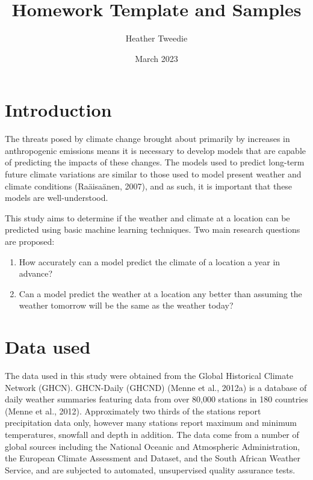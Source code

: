 \documentclass[12pt]{article}
\title{Homework Template and Samples}
\author{Heather Tweedie}
\date{March 2023}
\begin{document}
\markboth{\theauthor}{\thetitle}

\maketitle


\begin{abstract}

\end{abstract}

\section{Introduction}

The threats posed by climate change brought about primarily by increases in anthropogenic emissions means it is necessary to develop
models that are capable of predicting the impacts of these changes. The models used to predict long-term future climate variations
are similar to those used to model present weather and climate conditions (Raäisaänen, 2007), and as such, it is important that these
models are well-understood.

This study aims to determine if the weather and climate at a location can be predicted using basic machine learning techniques. Two
main research questions are proposed:

\begin{enumerate}
  \item How accurately can a model predict the climate of a location a year in advance?
  \item Can a model predict the weather at a location any better than assuming the weather tomorrow will be the same as the weather today?
\end{enumerate}

\section{Data used}

The data used in this study were obtained from the Global Historical Climate Network (GHCN). GHCN-Daily (GHCND) (Menne et al., 2012a)
is a database of daily weather summaries featuring data from over 80,000 stations in 180 countries (Menne et al., 2012). Approximately
two thirds of the stations report precipitation data only, however many stations report maximum and minimum temperatures, snowfall and
depth in addition. The data come from a number of global sources including the National Oceanic and Atmospheric Administration, the
European Climate Assessment and Dataset, and the South African Weather Service, and are subjected to automated, unsupervised quality
assurance tests.
\end{document}
